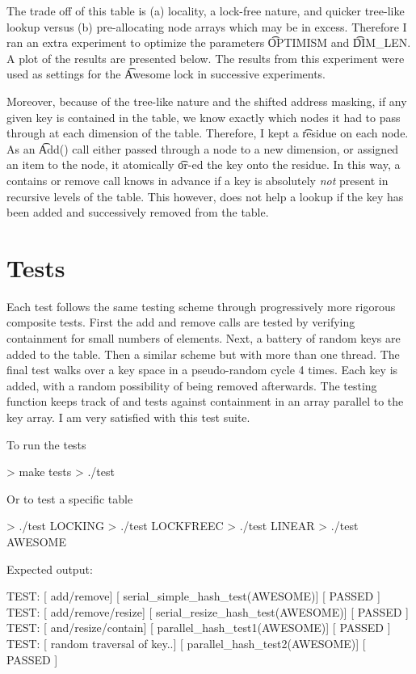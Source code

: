 The trade off of this table is (a) locality, a lock-free nature, and
quicker tree-like lookup versus (b) pre-allocating node arrays which
may be in excess. Therefore I ran an extra experiment to optimize the
parameters \t{OPTIMISM} and \t{DIM\_LEN}. A plot of the results are
presented below.  The results from this experiment were used as
settings for the \t{Awesome} lock in successive experiments.

Moreover, because of the tree-like nature and the shifted address
masking, if any given key is contained in the table, we know exactly
which nodes it had to pass through at each dimension of the
table. Therefore, I kept a \t{residue} on each node.  As an \t{Add()}
call either passed through a node to a new dimension, or assigned an
item to the node, it atomically \t{or}-ed the key onto the residue.
In this way, a contains or remove call knows in advance if a key is
absolutely \emph{not} present in recursive levels of the table. This
however, does not help a lookup if the key has been added and
successively removed from the table.


\section{Tests}

Each test follows the same testing scheme through progressively more
rigorous composite tests.  First the add and remove calls are tested
by verifying containment for small numbers of elements.  Next, a
battery of random keys are added to the table. Then a similar scheme
but with more than one thread. The final test walks over a key space
in a pseudo-random cycle 4 times.  Each key is added, with a random
possibility of being removed afterwards.  The testing function keeps
track of and tests against containment in an array parallel to the key
array. I am very satisfied with this test suite. 

To run the tests
\begin{code}
> make tests
> ./test
\end{code}

Or to test a specific table
\begin{code}
> ./test LOCKING
> ./test LOCKFREEC
> ./test LINEAR
> ./test AWESOME
\end{code}

Expected output:
\begin{code}
TEST: [                 add/remove] [ serial_simple_hash_test(AWESOME)] [ PASSED ]
TEST: [          add/remove/resize] [ serial_resize_hash_test(AWESOME)] [ PASSED ]
TEST: [         and/resize/contain] [     parallel_hash_test1(AWESOME)] [ PASSED ]
TEST: [  random traversal of key..] [     parallel_hash_test2(AWESOME)] [ PASSED ]
\end{code}


